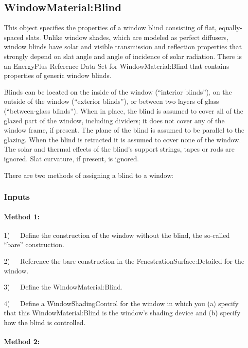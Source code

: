 \subsection{WindowMaterial:Blind}\label{windowmaterialblind}

This object specifies the properties of a window blind consisting of flat, equally-spaced slats. Unlike window shades, which are modeled as perfect diffusers, window blinds have solar and visible transmission and reflection properties that strongly depend on slat angle and angle of incidence of solar radiation. There is an EnergyPlus Reference Data Set for WindowMaterial:Blind that contains properties of generic window blinds.

Blinds can be located on the inside of the window (``interior blinds''), on the outside of the window (``exterior blinds''), or between two layers of glass (``between-glass blinds''). When in place, the blind is assumed to cover all of the glazed part of the window, including dividers; it does not cover any of the window frame, if present. The plane of the blind is assumed to be parallel to the glazing. When the blind is retracted it is assumed to cover none of the window. The solar and thermal effects of the blind's support strings, tapes or rods are ignored. Slat curvature, if present, is ignored.

There are two methods of assigning a blind to a window:

\subsubsection{Inputs}\label{inputs-23-005}

\paragraph{Method 1:}\label{method-1-1}

1)~~~Define the construction of the window without the blind, the so-called ``bare'' construction.

2)~~~Reference the bare construction in the FenestrationSurface:Detailed for the window.

3)~~~Define the WindowMaterial:Blind.

4)~~~Define a WindowShadingControl for the window in which you (a) specify that this WindowMaterial:Blind is the window's shading device and (b) specify how the blind is controlled.

\paragraph{Method 2:}\label{method-2-1}

